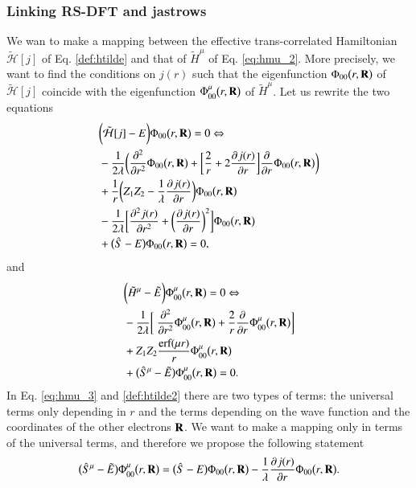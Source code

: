 \documentclass[aip,jcp,reprint,noshowkeys,superscriptaddress]{revtex4-1}
\newcommand{\deriv}[3]{\frac{\partial^{#3} #1}{\partial {#2}^{#3}}}
\newcommand{\bd}[1]{{\bf {#1}}}
\begin{document}
\subsubsection{Linking RS-DFT and jastrows}
We wan to make a mapping between the effective trans-correlated Hamiltonian $\tilde{\mathcal{H}}[j]$ of Eq. \eqref{def:htilde} and that of $\tilde{H}^\mu$ of Eq. \eqref{eq:hmu_2}. 
More precisely, we want to find the conditions on $j(r)$ such that the eigenfunction $\Phi_{00}\big(r,\bd{R}\big)$ of $\tilde{\mathcal{H}}[j]$ coincide with the eigenfunction $\Phi_{00}^{\mu}\big(r,\bd{R}\big)$ of $\tilde{H}^\mu$. 
Let us rewrite the two equations 
\begin{equation}
 \label{def:htilde2}
 \begin{aligned}
& \bigg(\tilde{\mathcal{H}}[j] - E \bigg) \Phi_{00}\big(r,\bd{R}\big) = 0 \Leftrightarrow \\ 
& - \frac{1}{2\lambda} \bigg( \deriv{}{r}{2}\Phi_{00}\big(r,\bd{R}\big) + \bigg[ \frac{2}{r}+  2 \deriv{j(r)}{r}{}\bigg] \deriv{}{r}{}\Phi_{00}\big(r,\bd{R}\big) \bigg) \\
 & + \frac{1}{r} \bigg( Z_1 Z_2 - \frac{1}{\lambda}  \deriv{j(r)}{r}{} \bigg) \Phi_{00}\big(r,\bd{R}\big) \\
 & - \frac{1}{2\lambda}\bigg[ \deriv{j(r)}{r}{2} + \bigg(\deriv{j(r)}{r}{}\bigg)^2\bigg]\Phi_{00}\big(r,\bd{R}\big)  \\ 
& + \big( \hat{S} - E\big) \Phi_{00}\big(r,\bd{R}\big) = 0, 
 \end{aligned}
\end{equation}
and 
\begin{equation}
 \begin{aligned}
 \label{eq:hmu_3}
& \bigg( \tilde{H}^\mu - \tilde{E} \bigg) \Phi_{00}^{\mu}\big(r,\bd{R}\big) = 0 \Leftrightarrow\\
& -\frac{1}{2\lambda} \bigg[ \deriv{}{r}{2} \Phi_{00}^{\mu}\big(r,\bd{R}\big) + \frac{2}{r} \deriv{}{r}{}\Phi_{00}^{\mu}\big(r,\bd{R}\big) \bigg] \\ 
& + Z_1 Z_2 \frac{\text{erf}(\mu r)}{r}\Phi_{00}^{\mu}\big(r,\bd{R}\big) \\
&+ \big(\hat{S}^\mu - \tilde{E}\big) \Phi_{00}^{\mu}\big(r,\bd{R}\big) = 0. 
 \end{aligned}
\end{equation}
In Eq. \eqref{eq:hmu_3} and \eqref{def:htilde2} there are two types of terms: the universal terms only depending in $r$ and the terms depending on the wave function and the coordinates of the other electrons $\bd{R}$.  
We want to make a mapping only in terms of the universal terms, and therefore we propose the following statement 
\begin{equation}
 \big(\hat{S}^\mu - \tilde{E}\big) \Phi_{00}^{\mu}\big(r,\bd{R}\big) = \big( \hat{S} - E\big) \Phi_{00}\big(r,\bd{R}\big) - \frac{1}{\lambda} \deriv{j(r)}{r}{} \Phi_{00}\big(r,\bd{R}\big). 
\end{equation}
\end{document}
